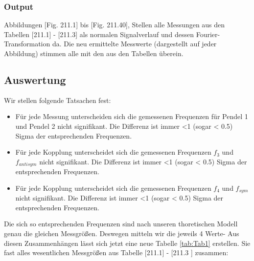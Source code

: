 \documentclass[a4paper,10pt]{article}
\begin{document}
\subsubsection{Output}
Abbildungen [Fig. 211.1] bis [Fig. 211.40], Stellen alle Messungen aus den Tabellen [211.1] - [211.3] als normalen Signalverlauf und dessen Fourier-Transformation da. Die neu ermittelte Messwerte (dargestellt auf jeder Abbildung) stimmen alle mit den aus den Tabellen überein.
\subsection{Auswertung}
Wir stellen folgende Tatsachen fest:
\begin{itemize}
\item Für jede Messung unterscheiden sich die gemessenen Frequenzen für Pendel 1 und Pendel 2 nicht signifikant. Die  Differenz ist immer <1 (sogar < 0.5) Sigma der entsprechenden Frequenzen.
\item Für jede Kopplung unterscheidet sich die gemessenen Frequenzen \(f_3\) und \(f_{antisym}\) nicht signifikant. Die  Differenz ist immer <1 (sogar < 0.5) Sigma der entsprechenden Frequenzen.
\item Für jede Kopplung unterscheidet sich die gemessenen Frequenzen \(f_4\) und \(f_{sym}\) nicht signifikant. Die  Differenz ist immer <1 (sogar < 0.5) Sigma der entsprechenden Frequenzen.
\end{itemize}
Die sich so entsprechenden Frequenzen sind nach unseren thoretischen Modell genau die gleichen Messgrößen. Deswegen mitteln wir die jeweils 4 Werte-
Aus diesen Zusammenhängen lässt sich jetzt eine neue Tabelle \ref{tab:Tab1} erstellen. Sie fast alles wesentlichen Messgrößen aus Tabelle  [211.1] - [211.3 ] zusammen:
\end{document}
